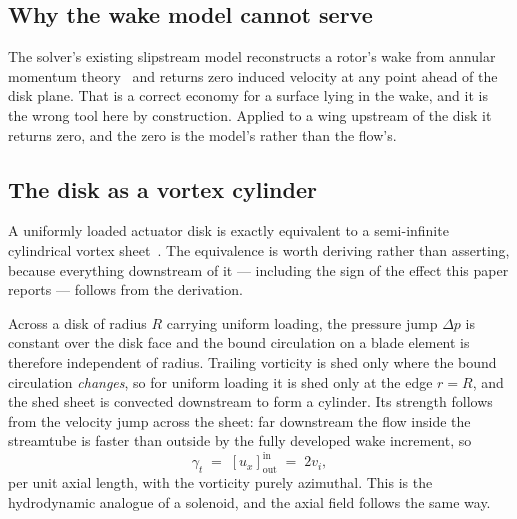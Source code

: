 \documentclass[submit]{aiaa-tc}%
\begin{document}
\subsection{Why the wake model cannot serve}

The solver's existing slipstream model reconstructs a rotor's wake from
annular momentum theory~\cite{glauert1935} and returns zero induced velocity at any point
ahead of the disk plane. That is a correct economy for a surface lying in
the wake, and it is the wrong tool here by construction. Applied to a wing
upstream of the disk it returns zero, and the zero is the model's rather
than the flow's.

\subsection{The disk as a vortex cylinder}

A uniformly loaded actuator disk is exactly equivalent to a semi-infinite
cylindrical vortex sheet~\cite{branlardGaunaa2015}. The equivalence is worth
deriving rather than asserting, because everything downstream of it --- including the sign of
the effect this paper reports --- follows from the derivation.

Across a disk of radius $R$ carrying uniform loading, the pressure jump
$\Delta p$ is constant over the disk face and the bound circulation on a
blade element is therefore independent of radius. Trailing vorticity is
shed only where the bound circulation \emph{changes}, so for uniform
loading it is shed only at the edge $r = R$, and the shed sheet is
convected downstream to form a cylinder. Its strength follows from the
velocity jump across the sheet: far downstream the flow inside the
streamtube is faster than outside by the fully developed wake increment,
so
%
\begin{equation}
  \label{eq:gamma}
  \gamma_t \;=\; \left[u_x\right]^{\text{in}}_{\text{out}}
             \;=\; 2 v_i ,
\end{equation}
%
per unit axial length, with the vorticity purely azimuthal. This is the
hydrodynamic analogue of a solenoid, and the axial field follows the same
way.
\end{document}
